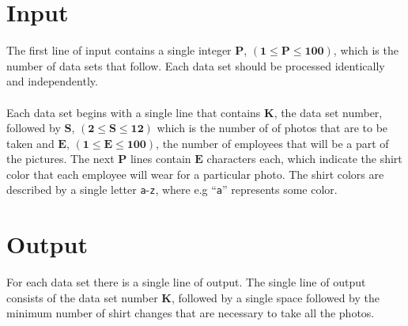 \documentclass[11pt]{article}
\begin{document}
\section{Input}
The first line of input contains a single integer $\boldsymbol{P}$, $(\boldsymbol{1} \le \boldsymbol{P} \le \boldsymbol{100})$, which is the number of data sets that follow. Each
data set should be processed identically and independently.
\\\\
Each data set begins with a single line that contains $\boldsymbol{K}$, the data
set number, followed by $\boldsymbol{S}$, $(\boldsymbol{2} \le \boldsymbol{S} \le \boldsymbol{12})$
which is the number of of photos that are to be taken and  $\boldsymbol{E}$,
$(\boldsymbol{1} \le \boldsymbol{E} \le \boldsymbol{100})$, the number of employees
that will be a part of the pictures. The next $\boldsymbol{P}$ lines contain $\boldsymbol{E}$
characters each, which indicate the shirt color that each employee will wear for a
particular photo. The shirt colors are described by a single letter \texttt{a}-\texttt{z},
where e.g ``\texttt{a}'' represents some color.

\section{Output}
For each data set there is a single line of output. The single line of output
consists of the data set number $\boldsymbol{K}$, followed by a single space
followed by the minimum number of shirt changes that are necessary to take all
the photos.
\end{document}
